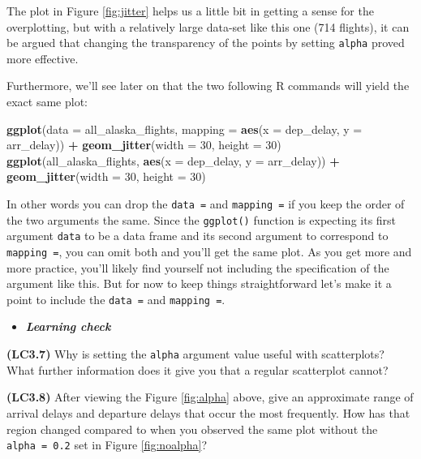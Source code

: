 \documentclass[12pt,]{krantz}
\makeatletter
\newenvironment{Shaded}{\begin{snugshade}}{\end{snugshade}}
\newcommand{\KeywordTok}[1]{\textcolor[rgb]{0.27,0.27,0.27}{\textbf{#1}}}
\newcommand{\DataTypeTok}[1]{\textcolor[rgb]{0.27,0.27,0.27}{#1}}
\newcommand{\DecValTok}[1]{\textcolor[rgb]{0.06,0.06,0.06}{#1}}
\newcommand{\StringTok}[1]{\textcolor[rgb]{0.5,0.5,0.5}{#1}}
\newcommand{\OperatorTok}[1]{\textcolor[rgb]{0.43,0.43,0.43}{\textbf{#1}}}
\newcommand{\NormalTok}[1]{#1}
\newenvironment{kframe}{%
\medskip{}
\setlength{\fboxsep}{.8em}
 \def\at@end@of@kframe{}%
 \ifinner\ifhmode%
  \def\at@end@of@kframe{\end{minipage}}%
  \begin{minipage}{\columnwidth}%
 \fi\fi%
 \def\FrameCommand##1{\hskip\@totalleftmargin \hskip-\fboxsep
 \colorbox{shadecolor}{##1}\hskip-\fboxsep
     \hskip-\linewidth \hskip-\@totalleftmargin \hskip\columnwidth}%
 \MakeFramed {\advance\hsize-\width
   \@totalleftmargin\z@ \linewidth\hsize
   \@setminipage}}%
 {\par\unskip\endMakeFramed%
 \at@end@of@kframe}
\renewenvironment{Shaded}{\begin{kframe}}{\end{kframe}}
\newenvironment{rmdblock}[1]
  {\begin{shaded*}
  \begin{itemize}
  \renewcommand{\labelitemi}{
    \raisebox{-.7\height}[0pt][0pt]{
    }
  }
  \item
  }
  {
  \end{itemize}
  \end{shaded*}
  }
\newenvironment{learncheck}
  {\begin{rmdblock}{warning}}
  {\end{rmdblock}}
\theoremstyle{definition}
\theoremstyle{definition}
\theoremstyle{definition}
\theoremstyle{remark}
\makeatother
\begin{document}
The plot in Figure \ref{fig:jitter} helps us a little bit in getting a
sense for the overplotting, but with a relatively large data-set like
this one (714 flights), it can be argued that changing the transparency
of the points by setting \texttt{alpha} proved more effective.

Furthermore, we'll see later on that the two following R commands will
yield the exact same plot:

\begin{Shaded}
\begin{Highlighting}[]
\KeywordTok{ggplot}\NormalTok{(}\DataTypeTok{data =}\NormalTok{ all_alaska_flights, }
       \DataTypeTok{mapping =} \KeywordTok{aes}\NormalTok{(}\DataTypeTok{x =}\NormalTok{ dep_delay, }\DataTypeTok{y =}\NormalTok{ arr_delay)) }\OperatorTok{+}\StringTok{ }
\StringTok{  }\KeywordTok{geom_jitter}\NormalTok{(}\DataTypeTok{width =} \DecValTok{30}\NormalTok{, }\DataTypeTok{height =} \DecValTok{30}\NormalTok{)}
\KeywordTok{ggplot}\NormalTok{(all_alaska_flights, }\KeywordTok{aes}\NormalTok{(}\DataTypeTok{x =}\NormalTok{ dep_delay, }\DataTypeTok{y =}\NormalTok{ arr_delay)) }\OperatorTok{+}\StringTok{ }
\StringTok{  }\KeywordTok{geom_jitter}\NormalTok{(}\DataTypeTok{width =} \DecValTok{30}\NormalTok{, }\DataTypeTok{height =} \DecValTok{30}\NormalTok{)}
\end{Highlighting}
\end{Shaded}

In other words you can drop the \texttt{data\ =} and \texttt{mapping\ =}
if you keep the order of the two arguments the same. Since the
\texttt{ggplot()} function is expecting its first argument \texttt{data}
to be a data frame and its second argument to correspond to
\texttt{mapping\ =}, you can omit both and you'll get the same plot. As
you get more and more practice, you'll likely find yourself not
including the specification of the argument like this. But for now to
keep things straightforward let's make it a point to include the
\texttt{data\ =} and \texttt{mapping\ =}.

\begin{learncheck}
\textbf{\emph{Learning check}}
\end{learncheck}

\textbf{(LC3.7)} Why is setting the \texttt{alpha} argument value useful
with scatterplots? What further information does it give you that a
regular scatterplot cannot?

\textbf{(LC3.8)} After viewing the Figure \ref{fig:alpha} above, give an
approximate range of arrival delays and departure delays that occur the
most frequently. How has that region changed compared to when you
observed the same plot without the \texttt{alpha\ =\ 0.2} set in Figure
\ref{fig:noalpha}?
\end{document}
